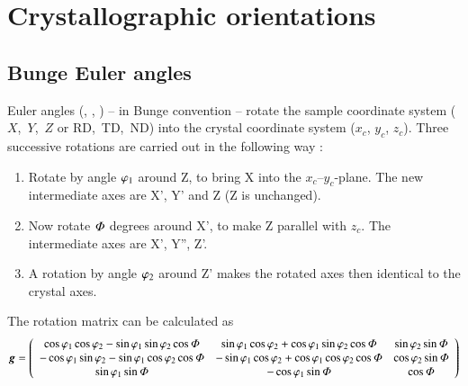 \chapter{Crystallographic orientations}
\section{Bunge Euler angles}
\label{bunges}
Euler angles (\beaphiI, \beaPhi , \beaphiII) -- in Bunge convention -- rotate the sample coordinate system ($X$,~$Y$,~$Z$  or RD,~TD,~ND) into the crystal coordinate system ($x_c$, $y_c$, $z_c$). 
Three successive rotations are carried out in the following way \citep[pg.\,4]{Bunge1982}:
\begin{enumerate}
	\item Rotate by angle $\varphi_1$ around Z, to bring X into the $x_c$--$y_c$-plane. The new intermediate axes are X', Y' and Z (Z is unchanged).
	\item Now rotate $\it{\Phi}$ degrees around X', to make Z parallel with $z_c$. The intermediate axes are X', Y'', Z'.
	\item A rotation by angle $\varphi_2$ around Z' makes the rotated axes then identical to the crystal axes.
\end{enumerate}

The rotation matrix can be calculated as
\[%
\bsym{g}=\left(\begin{array}{ccc}
\cos{\pI}\cos{\pII}-\sin{\pI}\sin{\pII}\cos{\beaPhi} & \sin{\pI}\cos{\pII}+\cos{\pI}\sin{\pII}\cos{\beaPhi}& \sin{\pII}\sin{\beaPhi}\\
-\cos{\pI}\sin{\pII}-\sin{\pI}\cos{\pII}\cos{\beaPhi} & -\sin{\pI}\cos{\pII}+\cos{\pI}\cos{\pII}\cos{\beaPhi}& \cos{\pII}\sin{\beaPhi}\\
\sin{\pI}\sin{\beaPhi} & -\cos{\pI}\sin{\beaPhi}& \cos{\beaPhi}
\end{array}\right)
\]

